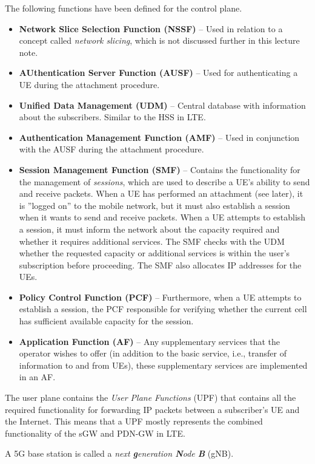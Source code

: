The following functions have been defined for the control plane.
\begin{itemize}
%
\item\textbf{Network Slice Selection Function (NSSF)} -- Used in relation to a concept called \emph{network slicing}, which is not discussed further in this lecture note.
%
\item\textbf{AUthentication Server Function (AUSF)} -- Used for authenticating a UE during the attachment procedure.
%
\item\textbf{Unified Data Management (UDM)} -- Central database with information about the subscribers. Similar to the HSS in LTE.
%
\item\textbf{Authentication Management Function (AMF)} -- Used in conjunction with the AUSF during the attachment procedure.
%
\item\textbf{Session Management Function (SMF)} -- Contains the functionality for the management of \emph{sessions}, which are used to describe a UE's ability to send and receive packets. When a UE has performed an attachment (see later), it is ''logged on'' to the mobile network, but it must also establish a session when it wants to send and receive packets. When a UE attempts to establish a session, it must inform the network about the capacity required and whether it requires additional services. The SMF checks with the UDM whether the requested capacity or additional services is within the user's subscription before proceeding. The SMF also allocates IP addresses for the UEs.
%
\item\textbf{Policy Control Function (PCF)} -- Furthermore, when a UE attempts to establish a session, the PCF responsible for verifying whether the current cell has sufficient available capacity for the session.
%
\item\textbf{Application Function (AF)} -- Any supplementary services that the operator wishes to offer (in addition to the basic service, i.e., transfer of information to and from UEs), these supplementary services are implemented in an AF.
%
\end{itemize}

The user plane contains the \emph{User Plane Functions} (UPF) that contains all the required functionality for forwarding IP packets between a subscriber's UE and the Internet. This means that a UPF mostly represents the combined functionality of the sGW and PDN-GW in LTE.

A 5G base station is called a \emph{next \textbf{g}eneration \textbf{N}ode \textbf{B}} (gNB).

